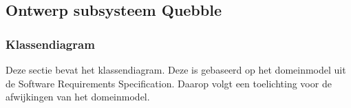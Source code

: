 

\subsection{Ontwerp subsysteem Quebble}

\subsubsection{Klassendiagram}
Deze sectie bevat het klassendiagram. Deze is gebaseerd op het domeinmodel uit de Software Requirements Specification. Daarop volgt een toelichting voor de afwijkingen van het domeinmodel.

